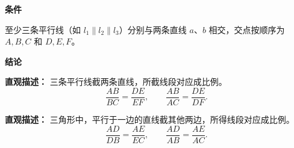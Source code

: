 \begin{statementbox}
	\textbf{\textcolor{CStatement}{条件}}
	\begin{description}[style=nextline, leftmargin=2.8em, labelsep=0.5em, itemsep=0.35em]
		\item[\textbf{\textcolor{CStatement}{条件1（平行线截两线）：}}] 至少三条平行线（如 $l_1\parallel l_2\parallel l_3$）分别与两条直线 $a$、$b$ 相交，交点按顺序为 $A,B,C$ 和 $D,E,F$。
	\end{description}

	\textbf{\textcolor{CStatement}{结论}}
	\begin{description}[style=nextline, leftmargin=2.8em, labelsep=0.5em, itemsep=0.45em]
		\item[\textbf{\textcolor{CStatement}{结论一（对应成比例）：}}]
			\textbf{\textcolor{CStatement}{直观描述：}}
			三条平行线截两条直线，所截线段对应成比例。
			\[
				\frac{AB}{BC}=\frac{DE}{EF},
				\qquad
				\frac{AB}{AC}=\frac{DE}{DF}.
			\]

		\item[\textbf{\textcolor{CStatement}{常见变形（三角形截线）：}}]
			\textbf{\textcolor{CStatement}{直观描述：}}
			三角形中，平行于一边的直线截其他两边，所得线段对应成比例。
			\[
				\frac{AD}{DB}=\frac{AE}{EC},
				\qquad
				\frac{AD}{AB}=\frac{AE}{AC}.
			\]
	\end{description}
\end{statementbox}
